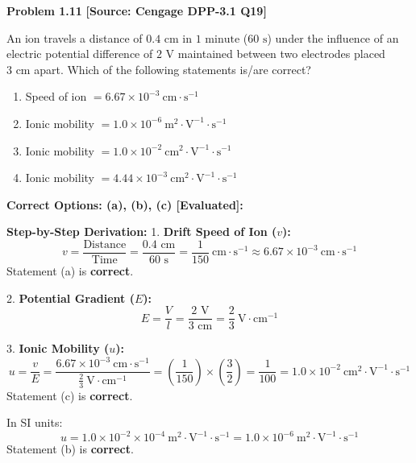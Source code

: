 \begin{problembox}
\textbf{Problem 1.11} \hfill \textbf{[Source: Cengage DPP-3.1 Q19]}

An ion travels a distance of $0.4\text{ cm}$ in $1\text{ minute}$ ($60\text{ s}$) under the influence of an electric potential difference of $2\text{ V}$ maintained between two electrodes placed $3\text{ cm}$ apart. Which of the following statements is/are correct?
\begin{enumerate}[label=(\alph*)]
    \item Speed of ion $= 6.67 \times 10^{-3}\ \text{cm}\cdot\text{s}^{-1}$
    \item Ionic mobility $= 1.0 \times 10^{-6}\ \text{m}^2\cdot\text{V}^{-1}\cdot\text{s}^{-1}$
    \item Ionic mobility $= 1.0 \times 10^{-2}\ \text{cm}^2\cdot\text{V}^{-1}\cdot\text{s}^{-1}$
    \item Ionic mobility $= 4.44 \times 10^{-3}\ \text{cm}^2\cdot\text{V}^{-1}\cdot\text{s}^{-1}$
\end{enumerate}
\end{problembox}
\begin{solution}
\textbf{Correct Options: (a), (b), (c) [Evaluated]:}

\textbf{Step-by-Step Derivation:}
1. \textbf{Drift Speed of Ion ($v$):}
\begin{equation*}
    v = \frac{\text{Distance}}{\text{Time}} = \frac{0.4\text{ cm}}{60\text{ s}} = \frac{1}{150}\ \text{cm}\cdot\text{s}^{-1} \approx 6.67 \times 10^{-3}\ \text{cm}\cdot\text{s}^{-1}
\end{equation*}
Statement (a) is \textbf{correct}.

2. \textbf{Potential Gradient ($E$):}
\begin{equation*}
    E = \frac{V}{l} = \frac{2\text{ V}}{3\text{ cm}} = \frac{2}{3}\ \text{V}\cdot\text{cm}^{-1}
\end{equation*}

3. \textbf{Ionic Mobility ($u$):}
\begin{equation*}
    u = \frac{v}{E} = \frac{6.67 \times 10^{-3}\ \text{cm}\cdot\text{s}^{-1}}{\frac{2}{3}\ \text{V}\cdot\text{cm}^{-1}} = \left(\frac{1}{150}\right) \times \left(\frac{3}{2}\right) = \frac{1}{100} = 1.0 \times 10^{-2}\ \text{cm}^2\cdot\text{V}^{-1}\cdot\text{s}^{-1}
\end{equation*}
Statement (c) is \textbf{correct}.

In SI units:
\begin{equation*}
    u = 1.0 \times 10^{-2} \times 10^{-4}\ \text{m}^2\cdot\text{V}^{-1}\cdot\text{s}^{-1} = 1.0 \times 10^{-6}\ \text{m}^2\cdot\text{V}^{-1}\cdot\text{s}^{-1}
\end{equation*}
Statement (b) is \textbf{correct}.
\end{solution}

